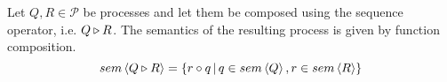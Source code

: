 




\begin{definition}
\label{def:sem_sequence}
Let $Q, R \in \mathcal{P}$ be processes and let them be composed using the sequence operator, i.e. $Q \triangleright R$. The semantics of the resulting process is given by function composition.
  \begin{equation}
    \label{eqn:sem_sequence}
    sem \left\langle Q \triangleright R \right\rangle = \left\{ r \circ q \,|\, q \in sem \left\langle Q \right\rangle, r \in sem \left\langle R \right\rangle \right\}
  \end{equation}
  \hfill\qedsymbol
\end{definition}

